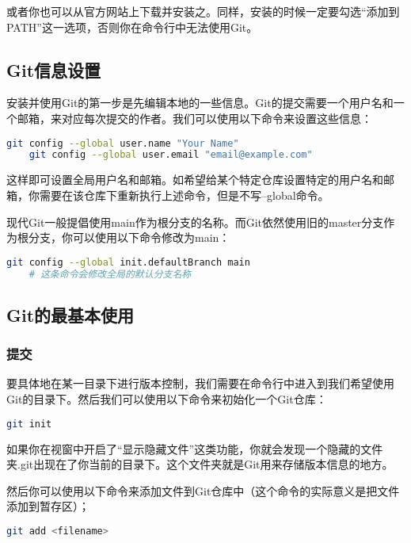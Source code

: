 或者你也可以从官方网站上下载并安装之。同样，安装的时候一定要勾选“添加到PATH”这一选项，否则你在命令行中无法使用Git。

\subsection{Git信息设置}

安装并使用Git的第一步是先编辑本地的一些信息。Git的提交需要一个用户名和一个邮箱，来对应每次提交的作者。我们可以使用以下命令来设置这些信息：

\begin{lstlisting}[language=bash]
    git config --global user.name "Your Name"
    git config --global user.email "email@example.com"
\end{lstlisting}

这样即可设置全局用户名和邮箱。如希望给某个特定仓库设置特定的用户名和邮箱，你需要在该仓库下重新执行上述命令，但是不写--global命令。

现代Git一般提倡使用main作为根分支的名称。而Git依然使用旧的master分支作为根分支，你可以使用以下命令修改为main：

\begin{lstlisting}[language=bash]
    git config --global init.defaultBranch main
    # 这条命令会修改全局的默认分支名称
\end{lstlisting}

\subsection{Git的最基本使用}

\subsubsection{提交}

要具体地在某一目录下进行版本控制，我们需要在命令行中进入到我们希望使用Git的目录下。然后我们可以使用以下命令来初始化一个Git仓库：

\begin{lstlisting}[language=bash]
    git init
\end{lstlisting}

如果你在视窗中开启了“显示隐藏文件”这类功能，你就会发现一个隐藏的文件夹.git出现在了你当前的目录下。这个文件夹就是Git用来存储版本信息的地方。

然后你可以使用以下命令来添加文件到Git仓库中（这个命令的实际意义是把文件添加到暂存区）；

\begin{lstlisting}[language=bash]
    git add <filename>
\end{lstlisting}

